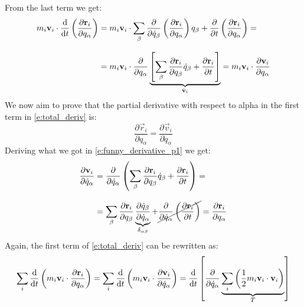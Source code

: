 From the last term we get:
\begin{equation} \label{e:funny_derivative_p1}
    \begin{split}
      m_i\vec{v}_i \cdot \dv{}{t}\brackets{\dfrac{\partial \vec{r}_i}{\partial q_{\alpha}}} &= m_i\vec{v}_i \cdot \bigsum_{\beta} \dfrac{\partial}{\partial \dot{q}_{\beta} }\brackets{\dfrac{\partial \vec{r}_i}{\partial q_{\alpha}}} q_{\beta} + \dfrac{\partial}{\partial t}\brackets{\dfrac{\partial \vec{r}_i}{\partial q_{\alpha}}} = \\[8pt]
      &= m_i\vec{v}_i \cdot \dfrac{\partial}{\partial q_{\alpha} }\underbrace{\sqbr{\bigsum_{\beta} \dfrac{\partial \vec{r}_i}{\partial q_{\beta}} \dot{q}_{\beta} + \dfrac{\partial \vec{r}_i}{\partial t}}}_{\dvec{v}_i} = m_i\vec{v}_i \cdot \dfrac{\partial \vec{v}_i}{\partial q_{\alpha}}
    \end{split}
\end{equation}
We now aim to prove that the partial derivative with respect to alpha in the first term in \eqref{e:total_deriv} is:
\begin{equation}
    \dfrac{\partial \vec{r}_i}{\partial q_{\alpha}} = \dfrac{\partial \vec{v}_i}{\partial \dot{q}_{\alpha}}
\end{equation}
Deriving what we got in \eqref{e:funny_derivative_p1} we get:
\begin{equation}
    \begin{split}
      \dfrac{\partial \vb{v}_i}{\partial \dot{q}_{\alpha}} &= \dfrac{\partial }{\partial \dot{q}_{\alpha}} \left(\displaystyle\sum_{\beta}\dfrac{\partial \vb{r}_i}{\partial q_{\beta}} \dot{q}_{\beta} + \dfrac{\partial \vb{r}_i}{\partial t}\right) = \\[8pt]
      &= \displaystyle\sum_{\beta}\dfrac{\partial \vb{r}_i}{\partial q_{\beta}} \underbrace{\dfrac{\partial \dot{q}_{\beta}}{\partial \dot{q}_{\alpha}}}_{\delta_{\alpha \beta}}  + \cancel{\dfrac{\partial }{\partial \dot{q}_{\alpha}}\left(\dfrac{\partial \vb{r}_i}{\partial t}\right)} = \dfrac{\partial \vb{r}_i}{\partial q_{\alpha}}
    \end{split}
\end{equation}
Again, the first term of \eqref{e:total_deriv} can be rewritten as:
\begin{equation}
    \bigsum_i \dv{}{t}\brackets{m_i\vec{v}_i \cdot \dfrac{\partial \vec{r}_i}{\partial q_{\alpha}}} = \bigsum_i\dv{}{t}\brackets{m_i\vec{v}_i \cdot \dfrac{\partial \vec{v}_i}{\partial \dot{q}_{\alpha}}} = \dv{}{t}\sqbr{\dfrac{\partial }{\partial \dot{q}_{\alpha}} \underbrace{\bigsum_i \brackets{\dfrac{1}{2}m_i \vec{v}_i \cdot \vec{v}_i}}_{T}}
\end{equation}
